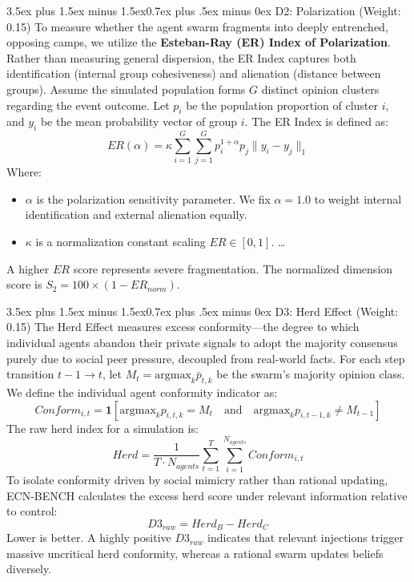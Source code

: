 \documentclass[11pt,journal,onecolumn]{IEEEtran}
\makeatletter
\renewcommand\subsection{\@startsection{subsection}{2}{\z@}%
  {3.5ex plus 1.5ex minus 1.5ex}{0.7ex plus .5ex minus 0ex}%
  {\normalfont\normalsize\bfseries}}
\makeatother
\begin{document}
\subsection{D2: Polarization (Weight: 0.15)}
To measure whether the agent swarm fragments into deeply entrenched, opposing camps, we utilize the \textbf{Esteban-Ray (ER) Index of Polarization}. Rather than measuring general dispersion, the ER Index captures both identification (internal group cohesiveness) and alienation (distance between groups). Assume the simulated population forms $G$ distinct opinion clusters regarding the event outcome. Let $p_i$ be the population proportion of cluster $i$, and $y_i$ be the mean probability vector of group $i$. The ER Index is defined as:
\begin{equation}
    ER(\alpha) = \kappa \sum_{i=1}^G \sum_{j=1}^G p_i^{1+\alpha} p_j \|y_i - y_j\|_1
\end{equation}
Where:
\begin{itemize}
    \item $\alpha$ is the polarization sensitivity parameter. We fix $\alpha = 1.0$ to weight internal identification and external alienation equally.
    \item $\kappa$ is a normalization constant scaling $ER \in [0, 1]$.
    \dots
\end{itemize}
A higher $ER$ score represents severe fragmentation. The normalized dimension score is $S_2 = 100 \times (1 - ER_{norm})$.

\subsection{D3: Herd Effect (Weight: 0.15)}
The Herd Effect measures excess conformity—the degree to which individual agents abandon their private signals to adopt the majority consensus purely due to social peer pressure, decoupled from real-world facts. For each step transition $t-1 \rightarrow t$, let $M_t = \text{argmax}_k \bar{p}_{t,k}$ be the swarm's majority opinion class. We define the individual agent conformity indicator as:
\begin{equation}
    Conform_{i,t} = \mathbf{1}\left[\text{argmax}_k p_{i,t,k} = M_t \quad \text{and} \quad \text{argmax}_k p_{i,t-1,k} \neq M_{t-1}\right]
\end{equation}
The raw herd index for a simulation is:
\begin{equation}
    Herd = \frac{1}{T \cdot N_{agents}} \sum_{t=1}^T \sum_{i=1}^{N_{agents}} Conform_{i,t}
\end{equation}
To isolate conformity driven by social mimicry rather than rational updating, ECN-BENCH calculates the excess herd score under relevant information relative to control:
\begin{equation}
    D3_{raw} = Herd_B - Herd_C
\end{equation}
Lower is better. A highly positive $D3_{raw}$ indicates that relevant injections trigger massive uncritical herd conformity, whereas a rational swarm updates beliefs diversely.
\end{document}
